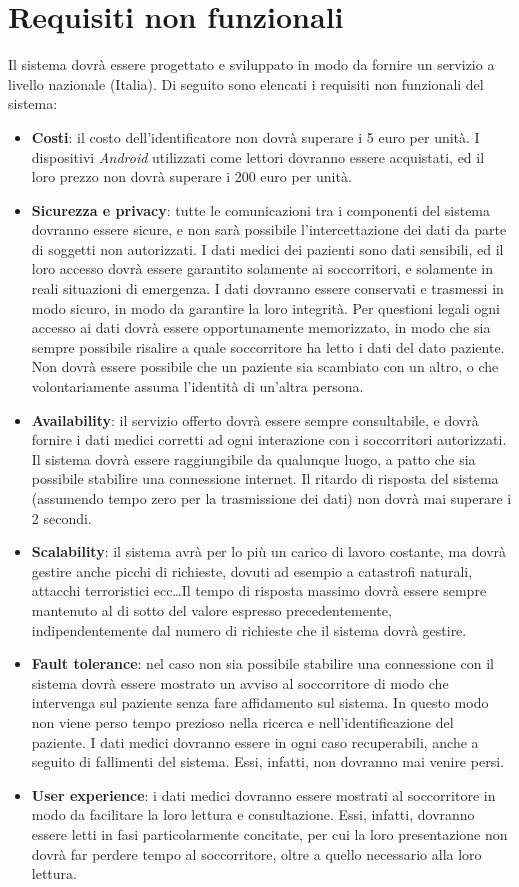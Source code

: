 \documentclass[a4paper,12pt]{report}
\begin{document}
\section{Requisiti non funzionali}
Il sistema dovrà essere progettato e sviluppato in modo da fornire un servizio a livello nazionale (Italia). 
Di seguito sono elencati i requisiti non funzionali del sistema:
\begin{itemize}
	\item \textbf{Costi}: il costo dell'identificatore non dovrà superare i 5 euro per unità. I dispositivi \emph{Android} utilizzati come lettori dovranno essere acquistati, ed il loro prezzo non dovrà superare i 200 euro per unità.
	\item \textbf{Sicurezza e privacy}: tutte le comunicazioni tra i componenti del sistema dovranno essere sicure, e non sarà possibile l'intercettazione dei dati da parte di soggetti non autorizzati. I dati medici dei pazienti sono dati sensibili, ed il loro accesso dovrà essere garantito solamente ai soccorritori, e solamente in reali situazioni di emergenza. I dati dovranno essere conservati e trasmessi in modo sicuro, in modo da garantire la loro integrità. Per questioni legali ogni accesso ai dati dovrà essere opportunamente memorizzato, in modo che sia sempre possibile risalire a quale soccorritore ha letto i dati del dato paziente. Non dovrà essere possibile che un paziente sia scambiato con un altro, o che volontariamente assuma l'identità di un'altra persona.
	\item \textbf{Availability}: il servizio offerto dovrà essere sempre consultabile, e dovrà fornire i dati medici corretti ad ogni interazione con i soccorritori autorizzati. Il sistema dovrà essere raggiungibile da qualunque luogo, a patto che sia possibile stabilire una connessione internet. Il ritardo di risposta del sistema (assumendo tempo zero per la trasmissione dei dati) non dovrà mai superare i 2 secondi.
	\item \textbf{Scalability}: il sistema avrà per lo più un carico di lavoro costante, ma dovrà gestire anche picchi di richieste, dovuti ad esempio a catastrofi naturali, attacchi terroristici ecc\dots Il tempo di risposta massimo dovrà essere sempre mantenuto al di sotto del valore espresso precedentemente, indipendentemente dal numero di richieste che il sistema dovrà gestire. 
	\item \textbf{Fault tolerance}: nel caso non sia possibile stabilire una connessione con il sistema dovrà essere mostrato un avviso al soccorritore di modo che intervenga sul paziente senza fare affidamento sul sistema. In questo modo non viene perso tempo prezioso nella ricerca e nell'identificazione del paziente. I dati medici dovranno essere in ogni caso recuperabili, anche a seguito di fallimenti del sistema. Essi, infatti, non dovranno mai venire persi. 
	\item \textbf{User experience}: i dati medici dovranno essere mostrati al soccorritore in modo da facilitare la loro lettura e consultazione. Essi, infatti, dovranno essere letti in fasi particolarmente concitate, per cui la loro presentazione non dovrà far perdere tempo al soccorritore, oltre a quello necessario alla loro lettura. 
\end{itemize}
\end{document}
